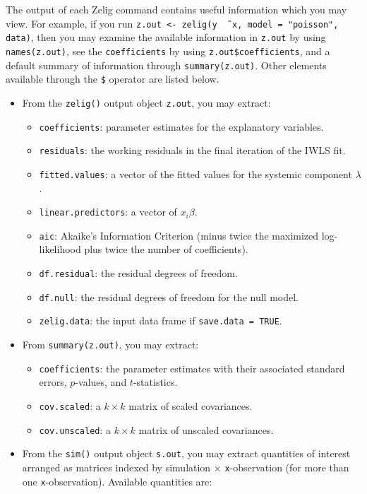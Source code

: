 The output of each Zelig command contains useful information which you
may view.  For example, if you run \texttt{z.out <- zelig(y \~\,
  x, model = "poisson", data)}, then you may examine the available
information in \texttt{z.out} by using \texttt{names(z.out)},
see the {\tt coefficients} by using {\tt z.out\$coefficients}, and
a default summary of information through \texttt{summary(z.out)}.
Other elements available through the {\tt \$} operator are listed
below.

\begin{itemize}
\item From the {\tt zelig()} output object {\tt z.out}, you may extract:
   \begin{itemize}
   \item {\tt coefficients}: parameter estimates for the explanatory
     variables.
   \item {\tt residuals}: the working residuals in the final iteration
     of the IWLS fit.
   \item {\tt fitted.values}: a vector of the fitted values for the systemic
     component $\lambda$.  
   \item {\tt linear.predictors}: a vector of $x_{i}\beta$.  
   \item {\tt aic}: Akaike's Information Criterion (minus twice the
     maximized log-likelihood plus twice the number of coefficients).
   \item {\tt df.residual}: the residual degrees of freedom.
   \item {\tt df.null}: the residual degrees of freedom for the null
     model.
   \item {\tt zelig.data}: the input data frame if {\tt save.data = TRUE}.  
   \end{itemize}

\item From {\tt summary(z.out)}, you may extract: 
   \begin{itemize}
   \item {\tt coefficients}: the parameter estimates with their
     associated standard errors, $p$-values, and $t$-statistics.
   \item{\tt cov.scaled}: a $k \times k$ matrix of scaled covariances.
   \item{\tt cov.unscaled}: a $k \times k$ matrix of unscaled
     covariances.  
   \end{itemize}

\item From the {\tt sim()} output object {\tt s.out}, you may extract
  quantities of interest arranged as matrices indexed by simulation
  $\times$ {\tt x}-observation (for more than one {\tt x}-observation).
  Available quantities are:


\end{itemize}
